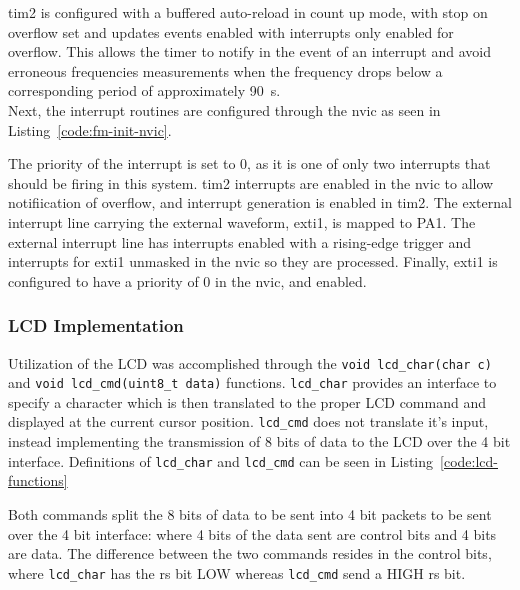 
\gls{tim2} is configured with a buffered auto-reload in count up mode,
with stop on overflow set and updates events enabled with interrupts
only enabled for overflow. This allows the timer to notify in the event
of an interrupt and avoid erroneous frequencies measurements when the
frequency drops below a corresponding period of approximately
\SI{90}{s}. \\

Next, the interrupt routines are configured through the \gls{nvic} as
seen in Listing~\ref{code:fm-init-nvic}.


The priority of the interrupt is set to 0, as it is one of only two
interrupts that should be firing in this system. \gls{tim2} interrupts
are enabled in the \gls{nvic} to allow notifiication of overflow, and
interrupt generation is enabled in \gls{tim2}. The external interrupt
line carrying the external waveform, \gls{exti1}, is mapped to PA1. The
external interrupt line has interrupts enabled with a rising-edge
trigger and interrupts for \gls{exti1} unmasked in the \gls{nvic} so
they are processed. Finally, \gls{exti1} is configured to have a
priority  of 0 in the \gls{nvic}, and enabled.

\subsubsection{LCD Implementation} \label{sec:lcd-imp}
Utilization of the LCD was accomplished through the
\lstinline{void lcd_char(char c)} and
\lstinline{void lcd_cmd(uint8_t data)} functions. \lstinline{lcd_char}
provides an interface to specify a character which is then translated to
the proper LCD command and displayed at the current cursor position.
\lstinline{lcd_cmd} does not translate it's input, instead implementing
the transmission of 8 bits of data to the LCD over the 4 bit interface.
Definitions of \lstinline{lcd_char} and \lstinline{lcd_cmd} can be seen
in Listing~\ref{code:lcd-functions}


Both commands split the 8 bits of data to be sent into 4 bit packets to
be sent over the 4 bit interface: where 4 bits of the data sent are
control bits and 4 bits are data. The difference between the two
commands resides in the control bits, where \lstinline{lcd_char} has the
\gls{rs} bit LOW whereas \lstinline{lcd_cmd} send a HIGH \gls{rs} bit.
\\

